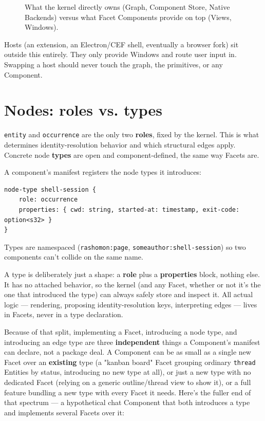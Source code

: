 \documentclass[11pt]{article}
\begin{document}
\begin{figure}[H]
{%
}
\caption{What the kernel directly owns (Graph, Component Store, Native Backends) versus what Facet Components provide on top (Views, Windows).}
\label{fig:layered-overview}
\end{figure}

Hosts (an extension, an Electron/CEF shell, eventually a browser fork) sit outside this entirely. They only provide Windows and route user input in. Swapping a host should never touch the graph, the primitives, or any Component.
\section{Nodes: roles vs. types}
\label{sec:org8af2230}

\texttt{entity} and \texttt{occurrence} are the only two \textbf{roles}, fixed by the kernel. This is what determines identity-resolution behavior and which structural edges apply. Concrete node \textbf{types} are open and component-defined, the same way Facets are.

A component's manifest registers the node types it introduces:

\begin{verbatim}
node-type shell-session {
    role: occurrence
    properties: { cwd: string, started-at: timestamp, exit-code: option<s32> }
}
\end{verbatim}

Types are namespaced (\texttt{rashomon:page}, \texttt{someauthor:shell-session}) so two components can't collide on the same name.

A type is deliberately just a shape: a \textbf{role} plus a \textbf{properties} block, nothing else. It has no attached behavior, so the kernel (and any Facet, whether or not it's the one that introduced the type) can always safely store and inspect it. All actual logic — rendering, proposing identity-resolution keys, interpreting edges — lives in Facets, never in a type declaration.

Because of that split, implementing a Facet, introducing a node type, and introducing an edge type are three \textbf{independent} things a Component's manifest can declare, not a package deal. A Component can be as small as a single new Facet over an \textbf{existing} type (a "kanban board" Facet grouping ordinary \texttt{thread} Entities by status, introducing no new type at all), or just a new type with no dedicated Facet (relying on a generic outline/thread view to show it), or a full feature bundling a new type with every Facet it needs. Here's the fuller end of that spectrum — a hypothetical chat Component that both introduces a type and implements several Facets over it:
\end{document}
